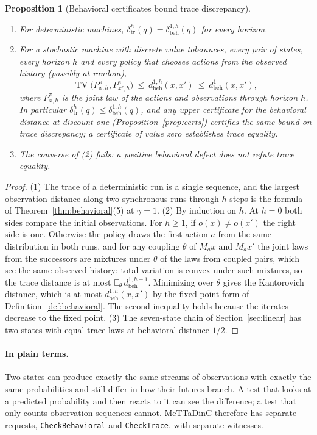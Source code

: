 \documentclass[11pt]{article}
\newcommand{\code}[1]{\texttt{#1}}
\newcommand{\TV}{\operatorname{TV}}
\newcommand{\dbd}{\delta_{\mathrm{beh}}}
\newcommand{\dtr}{\delta_{\mathrm{tr}}}
\newcommand{\dbeh}{d_{\mathrm{beh}}}
\newcommand{\plain}{\paragraph{In plain terms.}}
\theoremstyle{definition}
\theoremstyle{plain}
\newtheorem{proposition}[definition]{Proposition}
\begin{document}
\begin{proposition}[Behavioral certificates bound trace discrepancy]\label{prop:behtrace}\mbox{}
\begin{enumerate}
\item For deterministic machines, $\dtr^h(q)=\dbd^{1,h}(q)$ for every horizon.
\item For a stochastic machine with discrete value tolerances, every pair of states, every horizon
$h$ and every policy that chooses actions from the observed history (possibly at random),
\[
\TV\bigl(P^\pi_{x,h},P^\pi_{x',h}\bigr)\ \le\ \dbeh^{1,h}(x,x')\ \le\ \dbeh^1(x,x'),
\]
where $P^\pi_{x,h}$ is the joint law of the actions and observations through horizon $h$. In
particular $\dtr^h(q)\le\dbd^{1,h}(q)$, and any upper certificate for the behavioral distance at
discount one (Proposition~\ref{prop:certs}) certifies the same bound on trace discrepancy; a
certificate of value zero establishes trace equality.
\item The converse of (2) fails: a positive behavioral defect does not refute trace equality.
\end{enumerate}
\end{proposition}

\begin{proof}
(1) The trace of a deterministic run is a single sequence, and the largest observation distance
along two synchronous runs through $h$ steps is the formula of Theorem~\ref{thm:behavioral}(5)
at $\gamma=1$. (2) By induction on $h$. At $h=0$ both sides compare the initial observations. For
$h\ge1$, if $o(x)\ne o(x')$ the right side is one. Otherwise the policy draws the first action $a$
from the same distribution in both runs, and for any coupling $\theta$ of $M_ax$ and $M_ax'$ the
joint laws from the successors are mixtures under $\theta$ of the laws from coupled pairs, which
see the same observed history; total variation is convex under such mixtures, so the trace
distance is at most $\mathbb E_\theta\,\dbeh^{1,h-1}$. Minimizing over $\theta$ gives the Kantorovich
distance, which is at most $\dbeh^{1,h}(x,x')$ by the fixed-point form of
Definition~\ref{def:behavioral}. The second inequality holds because the iterates decrease to the
fixed point. (3) The seven-state chain of Section~\ref{sec:linear} has two states with equal trace
laws at behavioral distance $1/2$.
\end{proof}

\plain Two states can produce exactly the same streams of observations with exactly the same
probabilities and still differ in how their futures branch. A test that looks at a predicted
probability and then reacts to it can see the difference; a test that only counts observation
sequences cannot. MeTTaDinC therefore has separate requests, \code{CheckBehavioral} and
\code{CheckTrace}, with separate witnesses.
\end{document}
